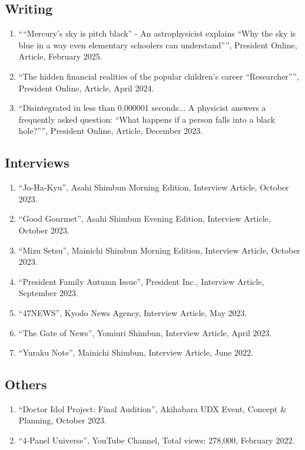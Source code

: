 \documentclass[uplatex, 12pt]{article}
\begin{document}
\subsection*{Writing}
\begin{enumerate}
\item ““Mercury’s sky is pitch black” - An astrophysicist explains “Why the sky is blue in a way even elementary schoolers can understand””, President Online, Article, February 2025.
\item “The hidden financial realities of the popular children's career “Researcher””, President Online, Article, April 2024.
\item “Disintegrated in less than 0.000001 seconds... A physicist answers a frequently asked question: “What happens if a person falls into a black hole?””, President Online, Article, December 2023.
\end{enumerate}
\subsection*{Interviews}
\begin{enumerate}
\item “Jo-Ha-Kyu”, Asahi Shimbun Morning Edition, Interview Article, October 2023.
\item “Good Gourmet”, Asahi Shimbun Evening Edition, Interview Article, October 2023.
\item “Mizu Setsu”, Mainichi Shimbun Morning Edition, Interview Article, October 2023.
\item “President Family Autumn Issue”, President Inc., Interview Article, September 2023.
\item “47NEWS”, Kyodo News Agency, Interview Article, May 2023.
\item “The Gate of News”, Yomiuri Shimbun, Interview Article, April 2023.
\item “Yuraku Note”, Mainichi Shimbun, Interview Article, June 2022.
\end{enumerate}
\subsection*{Others}
\begin{enumerate}
\item “Doctor Idol Project: Final Audition”, Akihabara UDX Event, Concept & Planning, October 2023.
\item “4-Panel Universe”, YouTube Channel, Total views: 278,000, February 2022.
\end{enumerate}

\end{document}
